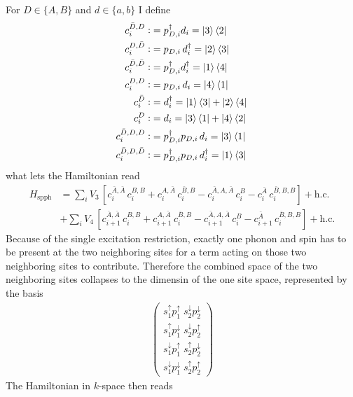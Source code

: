 For $D\in\{A,B\}$ and $d\in\{a,b\}$ I define
\begin{align*}
    c^{\bar{D},D}_i\vcentcolon&=p_{D,i}^\dagger d_i = \ket{3}\bra{2}\\
    c^{D,\bar{D}}_i\vcentcolon&=p_{D,i}\,d_i^\dagger = \ket{2}\bra{3}\\
    c^{\bar{D},\bar{D}}_i\vcentcolon&=p_{D,i}^\dagger d_i^\dagger = \ket{1}\bra{4}\\
    c^{D,D}_i\vcentcolon&=p_{D,i}\, d_i = \ket{4}\bra{1}\\
    c^{\bar{D}}_i\vcentcolon&= d_i^\dagger = \ket{1}\bra{3}+\ket{2}\bra{4}\\
    c^{D}_i\vcentcolon&= d_i = \ket{3}\bra{1}+\ket{4}\bra{2}\\
    c^{\bar{D},D,D}_i\vcentcolon&=p_{D,i}^\dagger p_{D,i}\, d_i = \ket{3}\bra{1}\\
    c^{\bar{D},D,\bar{D}}_i\vcentcolon&=p_{D,i}^\dagger p_{D,i}\, d_i^\dagger = \ket{1}\bra{3}\,
\end{align*}
what lets the Hamiltonian read
\begin{align*}
    H_\text{spph}&= \sum_i V_3\,\left[ c_i^{\bar{A},\bar{A}}\,c_i^{B,B} + c_i^{A,\bar{A}}\,c_i^{\bar{B},B} - c_i^{\bar{A},A,\bar{A}}\,c_i^{B} - c_i^{\bar{A}}\,c_i^{\bar{B},B,B}\right] +\text{h.c.}\\
    &+ \sum_i V_4\,\left[ c_{i+1}^{\bar{A},\bar{A}}\,c_i^{B,B} + c_{i+1}^{A,\bar{A}}\,c_i^{\bar{B},B} - c_{i+1}^{\bar{A},A,\bar{A}}\,c_i^{B} - c_{i+1}^{\bar{A}}\,c_i^{\bar{B},B,B}\right] +\text{h.c.}
\end{align*}
Because of the single excitation restriction, exactly one phonon and spin has to be present at the two neighboring sites for a term acting on those two neighboring sites to contribute. Therefore the combined space of the two neighboring sites collapses to the dimensin of the one site space, represented by the basis
\begin{align*}
    \begin{pmatrix}
        s_1^\uparrow p_1^\uparrow \; s_2^\downarrow p_2^\downarrow\\
        s_1^\uparrow p_1^\downarrow\; s_2^\downarrow p_2^\uparrow\\
        s_1^\downarrow p_1^\uparrow\; s_2^\uparrow p_2^\downarrow\\
        s_1^\downarrow p_1^\downarrow\; s_2^\uparrow p_2^\uparrow
    \end{pmatrix}
\end{align*}
The Hamiltonian in $k$-space then reads
